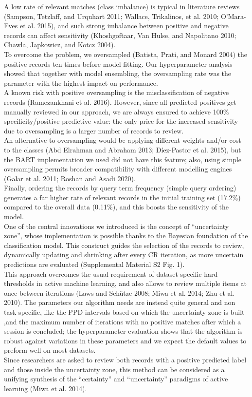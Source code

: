 \documentclass{article}
\begin{document}
A low rate of relevant matches (class imbalance) is typical in
literature reviews (Sampson, Tetzlaff, and Urquhart 2011; Wallace,
Trikalinos, et al. 2010; O'Mara-Eves et al. 2015), and such strong
imbalance between positive and negative records can affect sensitivity
(Khoshgoftaar, Van Hulse, and Napolitano 2010; Chawla, Japkowicz, and
Kotcz 2004).\\
To overcome the problem, we oversampled (Batista, Prati, and Monard
2004) the positive records ten times before model fitting. Our
hyperparameter analysis showed that together with model ensembling, the
oversampling rate was the parameter with the highest impact on
performance.\\
A known risk with positive oversampling is the misclassification of
negative records (Ramezankhani et al. 2016). However, since all
predicted positives get manually reviewed in our approach, we are always
ensured to achieve 100\% specificity/positive predictive value: the only
price for the increased sensitivity due to oversampling is a larger
number of records to review.\\
An alternative to oversampling would be applying different weights
and/or cost to the classes (Abd Elrahman and Abraham 2013; Díez-Pastor
et al. 2015), but the BART implementation we used did not have this
feature; also, using simple oversampling permits broader compatibility
with different modelling engines (Galar et al. 2011; Roshan and Asadi
2020).\\
Finally, ordering the records by query term frequency (simple query
ordering) generates a far higher rate of relevant records in the initial
training set (17.2\%) compared to the overall data (0.11\%), and this
boosts the sensitivity of the model.\\

One of the central innovations we introduced is the concept of
``uncertainty zone'', whose implementation is possible thanks to the
Bayesian foundation of the classification model. This construct guides
the selection of the records to review, dynamically updating and
shrinking after every CR iteration, as more uncertain predictions are
evaluated (Supplemental Material S2 Fig. 1).\\
This approach overcomes the usual requirement of dataset-specific hard
thresholds in active machine learning, and also allows to review
multiple items at once between iterations (Laws and Schütze 2008; Miwa
et al. 2014; Zhu et al. 2010). The parameters our algorithm needs are
instead quite general and non task-specific, like the PPD intervals
based on which the uncertainty zone is built ,and the maximum number of
iterations with no positive matches after which a session is concluded;
the hyperparameter evaluation shows that the algorithm is robust against
variations in these parameters and we expect the default values to
preform well on most datasets.\\
Since researchers are asked to review both records with a positive
predicted label and those inside the uncertainty zone, this method can
be considered as a unifying synthesis of the ``certainty'' and
``uncertainty'' paradigms of active learning (Miwa et al. 2014).\\
\end{document}
